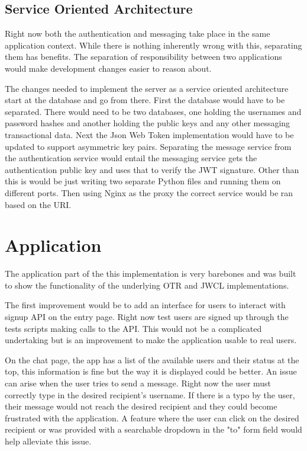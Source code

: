 \subsection{Service Oriented Architecture}


Right now both the authentication and messaging take place in the same application context. While there is nothing inherently wrong with this, separating them has benefits. The separation of responsibility between two applications would make development changes easier to reason about. 


The changes needed to implement the server as a service oriented architecture start at the database and go from there. First the database would have to be separated. There would need to be two databases, one holding the usernames and password hashes and another holding the public keys and any other messaging transactional data. Next the Json Web Token implementation would have to be updated to support asymmetric key pairs. Separating the message service from the authentication service would entail the messaging service gets the authentication public key and uses that to verify the JWT signature. Other than this is would be just writing two separate Python files and running them on different ports. Then using Nginx as the proxy the correct service would be ran based on the URI. 


\section{Application}


The application part of the this implementation is very barebones and was built to show the functionality of the underlying OTR and JWCL implementations. 


The first improvement would be to add an interface for users to interact with signup API on the entry page. Right now test users are signed up through the tests scripts making calls to the API. This would not be a complicated undertaking but is an improvement to make the application usable to real users.


On the chat page, the app has a list of the available users and their status at the top, this information is fine but the way it is displayed could be better. An issue can arise when the user tries to send a message. Right now the user must correctly type in the desired recipient's username. If there is a typo by the user, their message would not reach the desired recipient and they could become frustrated with the application. A feature where the user can click on the desired recipient or was provided with a searchable dropdown in the "to" form field would help alleviate this issue.


